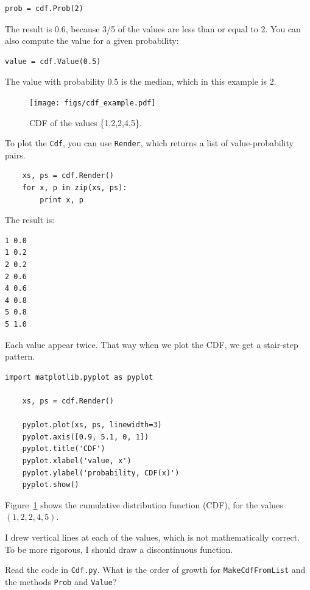 \documentclass[10pt]{book}
\begin{document}
\begin{verbatim}
prob = cdf.Prob(2)
\end{verbatim}

The result is 0.6, because 3/5 of the values are less than or equal to 2.
You can also compute the value for a given probability:

\begin{verbatim}
value = cdf.Value(0.5)
\end{verbatim}

The value with probability 0.5 is the median, which in this example is 2.

\begin{figure}
\centerline{\texttt{[image: figs/cdf\_example.pdf]}}
\caption{CDF of the values \{1,2,2,4,5\}.\label{fig.cdf}}
\end{figure}

To plot the {\tt Cdf}, you can use {\tt Render}, which returns
a list of value-probability pairs.

\begin{verbatim}
    xs, ps = cdf.Render()
    for x, p in zip(xs, ps):
        print x, p
\end{verbatim}

The result is:

\begin{verbatim}
1 0.0
1 0.2
2 0.2
2 0.6
4 0.6
4 0.8
5 0.8
5 1.0
\end{verbatim}

Each value appear twice.  That way when we plot the
CDF, we get a stair-step pattern.

\begin{verbatim}
import matplotlib.pyplot as pyplot

    xs, ps = cdf.Render()

    pyplot.plot(xs, ps, linewidth=3)
    pyplot.axis([0.9, 5.1, 0, 1])
    pyplot.title('CDF')
    pyplot.xlabel('value, x')
    pyplot.ylabel('probability, CDF(x)')
    pyplot.show()
\end{verbatim}

Figure~\ref{fig.cdf} shows the cumulative distribution
function (CDF), for the values $(1,2,2,4,5)$.

I drew vertical lines at each of the values, which is not
mathematically correct.  To be more rigorous, I should draw
a discontinuous function.

\begin{exercise}

Read the code in {\tt Cdf.py}.  What is the order of growth for
{\tt MakeCdfFromList} and the methods {\tt Prob} and {\tt Value}?
\end{exercise}
\end{document}
